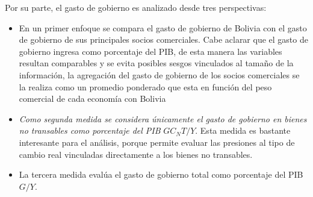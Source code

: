 \documentclass[12pt,letterpaper]{article}
\begin{document}
Por su parte, el gasto de gobierno es analizado desde tres perspectivas: 
\begin{itemize}
\item En un primer enfoque se compara el gasto de gobierno de Bolivia con el gasto de gobierno de sus principales socios comerciales. Cabe aclarar que el gasto de gobierno ingresa como porcentaje del PIB, de esta manera las variables resultan comparables y se evita posibles sesgos vinculados al tamaño de la información, la agregación del gasto de gobierno de los socios comerciales se la realiza como un promedio ponderado que esta en función del peso comercial de cada economía con Bolivia
\item \emph{Como segunda medida se considera únicamente el gasto de gobierno en bienes no transables como porcentaje del PIB} $GC_NT/Y$. Esta medida es bastante interesante para el análisis, porque permite evaluar las presiones al tipo de cambio real vinculadas directamente a los bienes no transables.
\item La tercera medida evalúa el gasto de gobierno total como porcentaje del PIB $G/Y$. 
\end{itemize}
\end{document}
